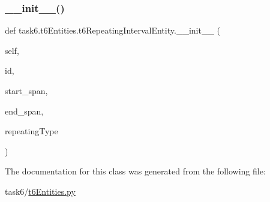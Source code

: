 \subsubsection{\texorpdfstring{\+\_\+\+\_\+init\+\_\+\+\_\+()}{\_\_init\_\_()}}
{\footnotesize\ttfamily def task6.\+t6\+Entities.\+t6\+Repeating\+Interval\+Entity.\+\_\+\+\_\+init\+\_\+\+\_\+ (\begin{DoxyParamCaption}\item[{}]{self,  }\item[{}]{id,  }\item[{}]{start\+\_\+span,  }\item[{}]{end\+\_\+span,  }\item[{}]{repeating\+Type }\end{DoxyParamCaption})}



The documentation for this class was generated from the following file\+:\begin{DoxyCompactItemize}
\item 
task6/\hyperlink{t6Entities_8py}{t6\+Entities.\+py}\end{DoxyCompactItemize}
